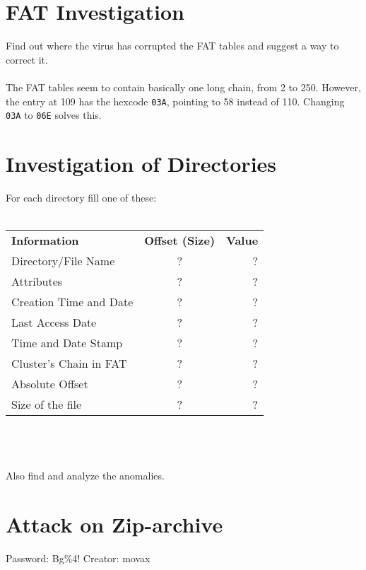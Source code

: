 \documentclass{article}
\begin{document}
\section{FAT Investigation}

Find out where the virus has corrupted the FAT tables and suggest a way to correct it.\\
\\
The FAT tables seem to contain basically one long chain, from 2 to 250. However, the entry at 109 has the hexcode \texttt{03A}, pointing to 58 instead of 110. Changing \texttt{03A} to \texttt{06E} solves this.

\section{Investigation of Directories}

For each directory fill one of these:\\
\\
\begin{tabular}{l c r}
    \hline
    \textbf{Information} & \textbf{Offset (Size)} & \textbf{Value}\\
    Directory/File Name & ? & ? \\
    Attributes & ? & ? \\
    Creation Time and Date & ? & ? \\
    Last Access Date & ? & ? \\
    Time and Date Stamp & ? & ? \\
    Cluster’s Chain in FAT & ? & ? \\
    Absolute Offset & ? & ? \\
    Size of the file & ? & ? \\
    \hline
\end{tabular}
\\
\\
\\
Also find and analyze the anomalies.

\section{Attack on Zip-archive}

Password: Bg\%4!
Creator: movax
\end{document}
